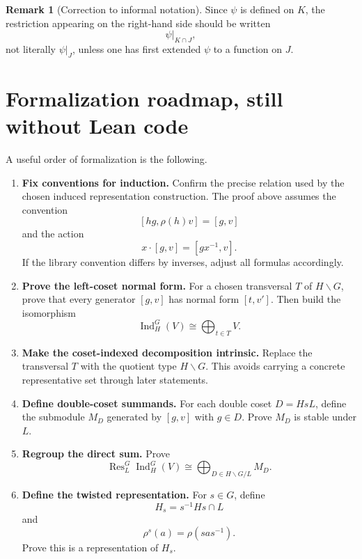 \documentclass[11pt]{article}
\theoremstyle{definition}
\newtheorem{remark}[theorem]{Remark}
\newcommand{\Ind}{\operatorname{Ind}}
\newcommand{\Res}{\operatorname{Res}}
\begin{document}
\begin{remark}[Correction to informal notation]
Since $\psi$ is defined on $K$, the restriction appearing on the right-hand side should be written
\[
  \psi|_{K\cap J},
\]
not literally $\psi|_J$, unless one has first extended $\psi$ to a function on $J$.
\end{remark}

\section{Formalization roadmap, still without Lean code}

A useful order of formalization is the following.

\begin{enumerate}[label=\textbf{Step \arabic*.},wide]
  \item \textbf{Fix conventions for induction.}
  Confirm the precise relation used by the chosen induced representation construction. The proof above assumes the convention
  \[
    [hg,\rho(h)v]=[g,v]
  \]
  and the action
  \[
    x\cdot[g,v]=[gx^{-1},v].
  \]
  If the library convention differs by inverses, adjust all formulas accordingly.

  \item \textbf{Prove the left-coset normal form.}
  For a chosen transversal $T$ of $H\backslash G$, prove that every generator $[g,v]$ has normal form $[t,v']$. Then build the isomorphism
  \[
    \Ind_H^G(V)\cong \bigoplus_{t\in T}V.
  \]

  \item \textbf{Make the coset-indexed decomposition intrinsic.}
  Replace the transversal $T$ with the quotient type $H\backslash G$. This avoids carrying a concrete representative set through later statements.

  \item \textbf{Define double-coset summands.}
  For each double coset $D=HsL$, define the submodule $M_D$ generated by $[g,v]$ with $g\in D$. Prove $M_D$ is stable under $L$.

  \item \textbf{Regroup the direct sum.}
  Prove
  \[
    \Res^G_L\Ind_H^G(V)
    \cong
    \bigoplus_{D\in H\backslash G/L}M_D.
  \]

  \item \textbf{Define the twisted representation.}
  For $s\in G$, define
  \[
    H_s=s^{-1}Hs\cap L
  \]
  and
  \[
    \rho^s(a)=\rho(sas^{-1}).
  \]
  Prove this is a representation of $H_s$.


\end{enumerate}
\end{document}
